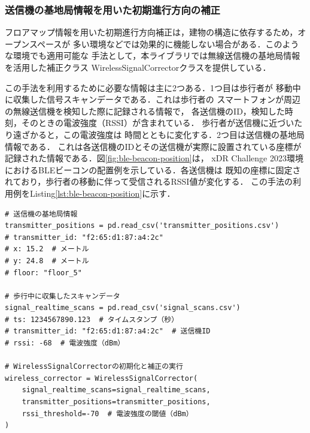
\subsubsection{送信機の基地局情報を用いた初期進行方向の補正}

フロアマップ情報を用いた初期進行方向補正は，建物の構造に依存するため，オープンスペースが
多い環境などでは効果的に機能しない場合がある．このような環境でも適用可能な
手法として，本ライブラリでは無線送信機の基地局情報を活用した補正クラス
WirelessSignalCorrectorクラスを提供している．

この手法を利用するために必要な情報は主に2つある．1つ目は歩行者が
移動中に収集した信号スキャンデータである．これは歩行者の
スマートフォンが周辺の無線送信機を検知した際に記録される情報で，
各送信機のID，検知した時刻，そのときの電波強度（RSSI）が含まれている．
歩行者が送信機に近づいたり遠ざかると，この電波強度は
時間とともに変化する．2つ目は送信機の基地局情報である．
これは各送信機のIDとその送信機が実際に設置されている座標が
記録された情報である．図\ref{fig:ble-beacon-position}は，
xDR Challenge 2023環境におけるBLEビーコンの配置例を示している．各送信機は
既知の座標に固定されており，歩行者の移動に伴って受信されるRSSI値が変化する．
この手法の利用例をListing\ref{lst:ble-beacon-position}に示す．

\begin{lstlisting}[caption={WirelessSignalCorrectorの使用例},label=lst:ble-beacon-position,float=h]
# 送信機の基地局情報
transmitter_positions = pd.read_csv('transmitter_positions.csv')
# transmitter_id: "f2:65:d1:87:a4:2c"
# x: 15.2  # メートル
# y: 24.8  # メートル
# floor: "floor_5"

# 歩行中に収集したスキャンデータ
signal_realtime_scans = pd.read_csv('signal_scans.csv')
# ts: 1234567890.123  # タイムスタンプ（秒）
# transmitter_id: "f2:65:d1:87:a4:2c"  # 送信機ID
# rssi: -68  # 電波強度（dBm）

# WirelessSignalCorrectorの初期化と補正の実行
wireless_corrector = WirelessSignalCorrector(
    signal_realtime_scans=signal_realtime_scans,
    transmitter_positions=transmitter_positions,
    rssi_threshold=-70  # 電波強度の閾値（dBm）
)
\end{lstlisting}

